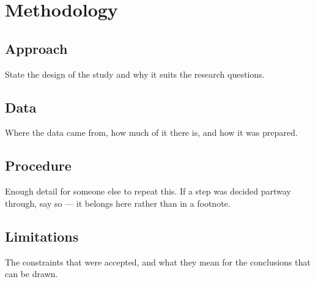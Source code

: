 \chapter{Methodology}
\label{ch:methodology}

\section{Approach}

State the design of the study and why it suits the research questions.

\section{Data}

Where the data came from, how much of it there is, and how it was
prepared.

\section{Procedure}

Enough detail for someone else to repeat this. If a step was decided
partway through, say so — it belongs here rather than in a footnote.

\section{Limitations}

The constraints that were accepted, and what they mean for the
conclusions that can be drawn.
